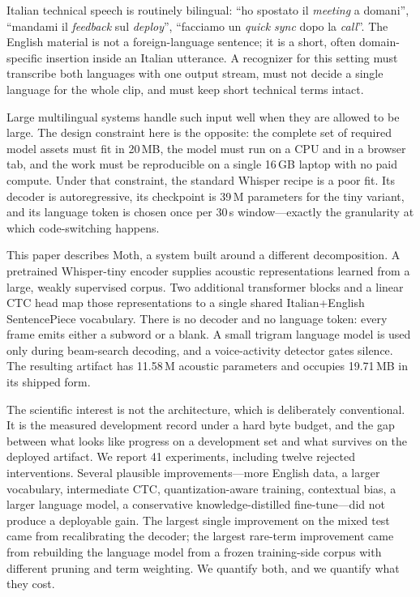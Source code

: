 \documentclass{article}
\newcommand{\moth}{Moth}
\begin{document}
Italian technical speech is routinely bilingual: ``ho spostato il \emph{meeting} a domani'',
``mandami il \emph{feedback} sul \emph{deploy}'', ``facciamo un \emph{quick sync} dopo la
\emph{call}''. The English material is not a foreign-language sentence; it is a short, often
domain-specific insertion inside an Italian utterance. A recognizer for this setting must
transcribe both languages with one output stream, must not decide a single language for the whole
clip, and must keep short technical terms intact.

Large multilingual systems handle such input well when they are allowed to be large. The design
constraint here is the opposite: the complete set of required model assets must fit in 20\,MB,
the model must run on a CPU and in a browser tab, and the work must be reproducible on a single
16\,GB laptop with no paid compute. Under that constraint, the standard Whisper recipe is a poor
fit. Its decoder is autoregressive, its checkpoint is 39\,M parameters for the tiny variant, and
its language token is chosen once per 30\,s window---exactly the granularity at which
code-switching happens.

This paper describes \moth{}, a system built around a different decomposition. A pretrained
Whisper-tiny encoder supplies acoustic representations learned from a large, weakly supervised
corpus. Two additional transformer blocks and a linear CTC head map those representations to a
single shared Italian+English SentencePiece vocabulary. There is no decoder and no language
token: every frame emits either a subword or a blank. A small trigram language model is used only
during beam-search decoding, and a voice-activity detector gates silence. The resulting artifact
has 11.58\,M acoustic parameters and occupies 19.71\,MB in its shipped form.

The scientific interest is not the architecture, which is deliberately conventional. It is the
measured development record under a hard byte budget, and the gap between what looks like progress
on a development set and what survives on the deployed artifact. We report 41 experiments,
including twelve rejected interventions. Several plausible improvements---more English data, a
larger vocabulary, intermediate CTC, quantization-aware training, contextual bias, a larger
language model, a conservative knowledge-distilled fine-tune---did not produce a deployable gain.
The largest single improvement on the mixed test came from recalibrating the decoder; the
largest rare-term improvement came from rebuilding the language model from a frozen training-side
corpus with different pruning and term weighting. We quantify both, and we quantify what they
cost.
\end{document}
